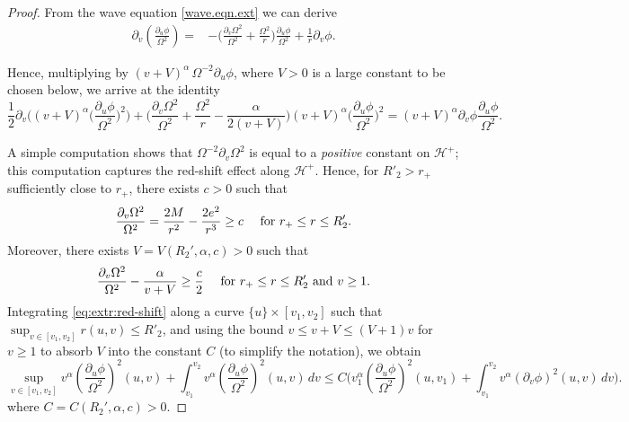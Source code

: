 \documentclass[12 pt, reqno]{amsart}
\theoremstyle{definition}
\theoremstyle{remark}
\numberwithin{equation}{section}
\newcommand{\set}[1]{\{#1\}}
\newcommand{\ud}{d}
\newcommand{\rd}{\partial}
\newcommand{\bb}{\Big}
\newcommand{\0}{\emptyset}
\newcommand{\alp}{\alpha}
\newcommand{\Omg}{\Omega}
\newcommand{\calH}{\mathcal H}
\newcommand{\EH}{\calH^{+}}
\begin{document}
\begin{proof} 
From the wave equation \eqref{wave.eqn.ext} we can derive
\begin{align*}
	\rd_{v} (\frac{\rd_{u} \phi}{\Omg^{2}}) 
	=& - \bb( \frac{\rd_{v} \Omg^{2}}{\Omg^{2}} + \frac{\Omg^{2}}{r} \bb) \frac{\rd_{u} \phi}{\Omg^{2}} + \frac{1}{r} \rd_{v} \phi.
\end{align*}

Hence, multiplying by $(v + V)^{\alp} \, \Omg^{-2} \rd_{u} \phi$, where $V > 0$ is a large constant to be chosen below, we arrive at the identity
\begin{equation} \label{eq:extr:red-shift}
	\frac{1}{2} \rd_{v} \bb( (v+V)^{\alp} \big( \frac{\rd_{u} \phi}{\Omg^{2}} \big)^{2} \bb) + \bb( \frac{\rd_{v} \Omg^{2}}{\Omg^{2}} + \frac{\Omg^{2}}{r} - \frac{\alp}{2(v+V)} \bb) (v+V)^{\alp} \big( \frac{\rd_{u} \phi}{\Omg^{2}} \big)^{2} = (v+V)^{\alp} \rd_{v} \phi \frac{\rd_{u} \phi}{\Omg^{2}}.
\end{equation}

A simple computation shows that $\Omg^{-2} \rd_{v} \Omg^{2}$ is equal to a \emph{positive} constant on $\EH$; this computation captures the red-shift effect along $\EH$. Hence, for $R'_{2} > r_{+}$ sufficiently close to $r_{+}$, there exists $c > 0$ such that
\begin{equation*}
	\frac{\rd_{v} \Omg^{2}}{\Omg^{2}}= \frac{2M}{r^{2}} - \frac{2 e^{2}}{r^{3}} \geq c \quad \hbox{ for } r_{+} \leq r \leq R'_{2}.
\end{equation*}
Moreover, there exists $V = V(R_{2}', \alp, c) > 0$ such that 
\begin{equation*}
	\frac{\rd_{v} \Omg^{2}}{\Omg^{2}} - \frac{\alp}{v+V}  \geq \frac{c}{2} \quad \hbox{ for } r_{+} \leq r \leq R'_{2} \hbox{ and } v \geq 1.
\end{equation*} 
Integrating \eqref{eq:extr:red-shift} along a curve $\set{u} \times [v_{1}, v_{2}]$ such that $\sup_{v \in [v_{1}, v_{2}]} r(u,v) \leq R'_{2}$, and using the bound $v \leq v + V \leq (V+1) v$ for $v \geq 1$ to absorb $V$ into the constant $C$ (to simplify the notation), we obtain
\begin{equation} \label{eq:red-shift:duphi}
	\sup_{v \in [v_{1}, v_{2}]} v^{\alp} (\frac{\rd_{u} \phi}{\Omg^{2}})^{2}(u, v) + \int_{v_{1}}^{v_{2}} v^{\alp} (\frac{\rd_{u} \phi}{\Omg^{2}})^{2} (u, v)\, \ud v 
	\leq  C \bb( v_{1}^{\alp} (\frac{\rd_{u} \phi}{\Omg^{2}})^{2}(u, v_{1}) + \int_{v_{1}}^{v_{2}} v^{\alp} (\rd_{v} \phi)^{2}(u, v) \, \ud v \bb).
\end{equation}
where $C = C(R_{2}', \alp, c) > 0$. 


\end{proof}
\end{document}
